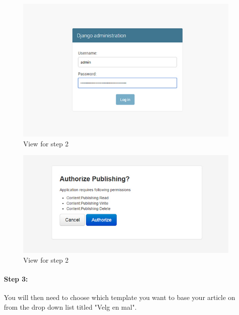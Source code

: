 \begin{figure}[H]
    \centering
    \includegraphics[scale=0.70]{fig/userManual/2}
    \caption{View for step 2}
    \label{fig:manual2}
\end{figure}

\begin{figure}[H]
    \centering
    \includegraphics[scale=0.70]{fig/userManual/3}
    \caption{View for step 2}
    \label{fig:manual3}
\end{figure}

\paragraph{Step 3:} You will then need to choose which template you want to base your article on from the drop down list titled "Velg en mal".

